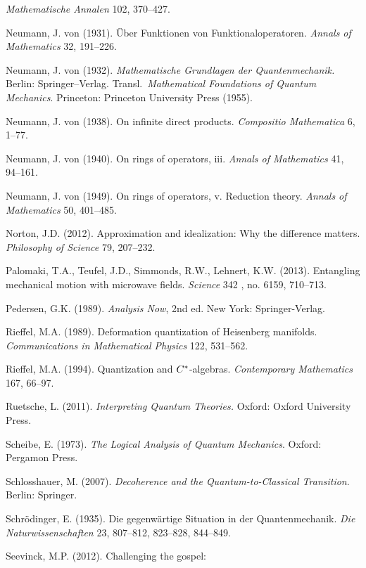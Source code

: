 \documentclass[12pt]{article}
\begin{document}
\begin{footnotesize}
\begin{trivlist}
  \emph{Mathematische Annalen} 102, 370--427. 
 \item Neumann, J. von (1931). \"{U}ber Funktionen von Funktionaloperatoren. \emph{Annals of Mathematics} 32, 191--226.
\item Neumann, J. von (1932). \emph{Mathematische Grundlagen der Quantenmechanik.}
Berlin: Springer--Verlag. Transl.\ \emph{Mathematical Foundations of Quantum Mechanics}. Princeton: Princeton University Press  (1955).
\item Neumann, J. von (1938). On infinite direct products. \emph{Compositio Mathematica} 6, 1--77. 
\item Neumann, J. von (1940). On rings of operators, {\sc iii}. \emph{Annals of Mathematics} 41, 94--161.
\item Neumann, J. von (1949). On rings of operators, {\sc v}.  Reduction theory.   \emph{Annals of Mathematics} 50, 401--485.
\item Norton, J.D. (2012). Approximation and idealization: Why the difference matters.
\emph{Philosophy of Science} 79, 207--232.
\item Palomaki, T.A.,  Teufel, J.D.,  Simmonds,  R.W.,  Lehnert, K.W. (2013). Entangling mechanical motion with microwave fields. \emph{Science}  342 , no. 6159, 710--713.  
\item Pedersen, G.K. (1989). \emph{Analysis Now}, 2nd ed. New York: Springer-Verlag. 
\item Rieffel, M.A. (1989). Deformation quantization of Heisenberg manifolds.  \emph{Communications in Mathematical Physics}  122, 531--562. 
\item Rieffel, M.A. (1994). 
  Quantization and $C\sp *$-algebras.   \emph{Contemporary Mathematics} 167,  66--97.
   \item Ruetsche, L. (2011). \emph{Interpreting Quantum Theories.} Oxford: Oxford University Press.
  \item Scheibe, E. (1973). \emph{The Logical Analysis of Quantum Mechanics}. Oxford: Pergamon Press.
\item Schlosshauer, M. (2007). \emph{Decoherence and the Quantum-to-Classical Transition}. Berlin: Springer. 
\item  Schr\"{o}dinger, E. (1935). Die gegenw\"{a}rtige Situation in der Quantenmechanik. \emph{Die Naturwissenschaften} 23, 807--812, 823--828, 844--849.
\item Seevinck, M.P. (2012). Challenging the gospel:

\end{trivlist}
\end{footnotesize}
\end{document}
